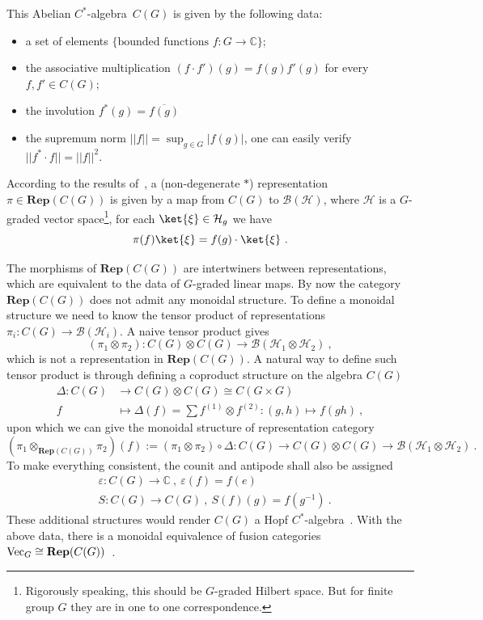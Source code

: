 \documentclass[a4paper,11pt]{article}
\newcommand{\Ch}{\mathrm{Ch}}
\newcommand{\CH}{\Ch_{\mu_1\mu_2}(Q_F,{t},{q})}
\newcommand{\Rep}{\textbf{Rep}}
\newcommand{\be}{\begin{equation}}
\newcommand{\ee}{\end{equation}}
\newcommand{\ba}{\begin{aligned}}
\newcommand{\ea}{\end{aligned}}
\def\bbC{\mathbb{C}}
\def\CH{\mathcal{H}}
\def\calg{$C^*$-algebra\ }
\def\vecg{{\rm Vec}_G}
\begin{document}
This Abelian \calg $C(G)$ is given by the following data:
\begin{itemize}
    \item a set of elements $\{ \text{bounded functions \ } f:G\to \bbC\}$;
    \item the associative multiplication $(f\cdot f') (g) = f(g)f'(g)$ for every $f,f'\in C(G)$;
    \item the involution $f^*(g) = \overline{f(g)}$
    \item the supremum norm $||f|| = \sup_{g\in G} |f(g)|$, one can easily verify $||f^*\cdot f||= ||f||^2$.
\end{itemize}
According to the results of~\cite{Takesaki:1979,Farah:2019}, a (non-degenerate $*$) representation $\pi \in  \Rep(C(G))$ is given by a map from $C(G)$ to $\mathscr{B}(\CH)$, where $\CH$ is a $G$-graded vector space\footnote{Rigorously speaking, this should be $G$-graded Hilbert space. But for finite group $G$ they are in one to one correspondence.}, for each $\ket{\xi}\in \CH_g$ we have
\be
\pi(f)\ket{\xi}  = f(g)\cdot \ket{\xi} \ .
\ee

The morphisms of $\Rep(C(G))$ are intertwiners between representations, which are equivalent to the data of $G$-graded linear maps. By now the category $\Rep (C(G))$ does not admit any monoidal structure. To define a monoidal structure we need to know the tensor product of representations $\pi_i:C(G) \to \mathscr{B}(\CH_i)$. A naive tensor product gives
\be
(\pi_1\otimes \pi_2):  C(G)\otimes C(G) \to \mathscr{B}(\CH_1\otimes\CH_2) \ , \ee
which is not a representation in $\Rep (C(G))$.
A natural way to define such tensor product is through defining a coproduct structure on the algebra $C(G)$
\be\ba
\Delta : C(G) &\to C(G)\otimes C(G) \cong C(G\times G) \\
f   &\mapsto \Delta(f)= \sum f^{(1)}\otimes f^{(2)}:(g,h)\mapsto f(gh) \ ,
\ea\ee
upon which we can give the monoidal structure of representation category
\be
(\pi_1\otimes_{\Rep(C(G))} \pi_2)(f) := (\pi_1\otimes \pi_2)\circ\Delta :C(G) \to C(G)\otimes C(G) \to \mathscr{B}(\CH_1\otimes \CH_2)  \ .
\ee
To make everything consistent, the counit and antipode shall also be assigned
\be\ba
&\varepsilon:C(G) \to \bbC \ , \ \varepsilon(f) = f(e)\\
&S:C(G) \to C(G) \ , \ S(f)(g) = f(g^{-1}) \ .
\ea\ee
These additional structures would render $C(G)$ a Hopf \calg. With the above data, there is a monoidal equivalence of fusion categories $\vecg \cong \Rep(C(G))$~\cite{Etingof:2005,Mason:2017klg,etingof2017tensor,Khovanov:2015acq}.
\end{document}

